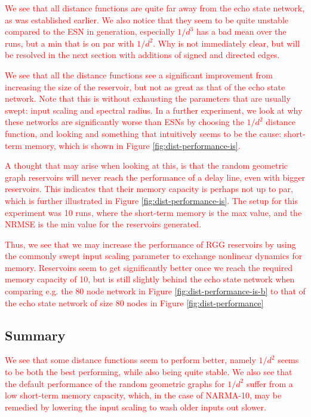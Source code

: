 \textcolor{red}{
  We see that all distance functions are quite far away from the echo state
network, as was established earlier. We also notice that they seem to be quite
unstable compared to the ESN in generation, especially $1/d^3$ has a bad mean
over the runs, but a min that is on par with $1/d^2$. Why is not immediately
clear, but will be resolved in the next section with additions of signed and
directed edges.
}

\textcolor{red}{
  We see that all the distance functions see a significant improvement from
increasing the size of the reservoir, but not as great as that of the echo state
network. Note that this is without exhausting the parameters that are usually
swept: input scaling and spectral radius. In a further experiment, we look at
why these networks are significantly worse than ESNs by choosing the $1/d^2$
distance function, and looking and something that intuitively seems to be the
cause: short-term memory, which is shown in Figure
\ref{fig:dist-performance-is}.
}

\textcolor{red}{
  A thought that may arise when looking at this, is that the random geometric
graph reservoirs will never reach the performance of a delay line, even with
bigger reservoirs. This indicates that their memory capacity is perhaps not up
to par, which is further illustrated in Figure
\ref{fig:dist-performance-is}. The setup for this experiment was 10 runs, where
the short-term memory is the max value, and the NRMSE is the min value for the
reservoirs generated.
}

\textcolor{red}{
  Thus, we see that we may increase the performance of RGG reservoirs by using
the commonly swept input scaling parameter to exchange nonlinear dynamics for
memory. Reservoirs seem to get significantly better once we reach the required
memory capacity of 10, but is still slightly behind the echo state network when
comparing e.g. the 80 node network in Figure \ref{fig:dist-performance-is-b} to
that of the echo state network of size 80 nodes in Figure
\ref{fig:dist-performance}
}

\subsection{Summary}

\textcolor{red}{
  We see that some distance functions seem to perform better, namely $1/d^2$
seems to be both the best performing, while also being quite stable. We also see
that the default performance of the random geometric graphs for $1/d^2$ suffer
from a low short-term memory capacity, which, in the case of NARMA-10, may be
remedied by lowering the input scaling to wash older inputs out slower.
}

